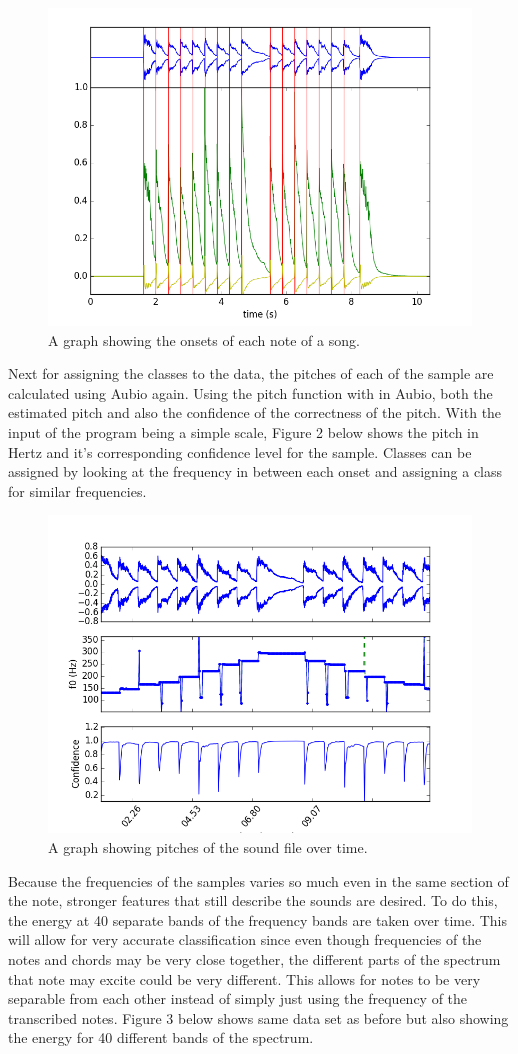 \documentclass[conference]{IEEEtran}
\begin{document}
\begin{figure}[htb]
\centering 
\includegraphics[width=.48\textwidth]{onsets.png}
\caption{A graph showing the onsets of each note of a song.}
\vspace*{-20pt}
\label{fig:onset}
\end{figure}

Next for assigning the classes to the data, the pitches of each of the sample are calculated using Aubio again. Using the pitch function with in Aubio, both the estimated pitch and also the confidence of the correctness of the pitch.  With the input of the program being a simple scale, Figure 2 below shows the pitch in Hertz and it's corresponding confidence level for the sample.  Classes can be assigned by looking at the frequency in between each onset and assigning a class for similar frequencies.

\begin{figure}[htb]
\centering 
\includegraphics[width=.48\textwidth]{pitch.png}
\caption{A graph showing pitches of the sound file over time.}
\vspace*{-20pt}
\label{fig:pitch}
\end{figure}

Because the frequencies of the samples varies so much even in the same section of the note, stronger features that still describe the sounds are desired.  To do this, the energy at 40 separate bands of the frequency bands are taken over time.  This will allow for very accurate classification since even though frequencies of the notes and chords may be very close together, the different parts of the spectrum that note may excite could be very different.  This allows for notes to be very separable from each other instead of simply just using the frequency of the transcribed notes.  Figure 3 below shows same data set as before but also showing the energy for 40 different bands of the spectrum.
\end{document}
